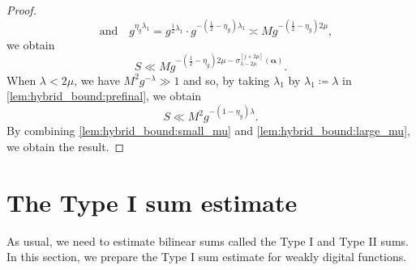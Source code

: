 \documentclass[hidelinks]{amsart}
\numberwithin{equation}{section}
\theoremstyle{plain}
\theoremstyle{definition}
\begin{document}
\begin{proof}
\[\quad\text{and}\quad
g^{\eta_{g}\lambda_{1}}
=
g^{\frac{1}{2}\lambda_{1}}
\cdot
g^{-(\frac{1}{2}-\eta_{g})\lambda_{1}}
\asymp
M
g^{-(\frac{1}{2}-\eta_{g})2\mu},
\]
we obtain
\begin{equation}
\label{lem:hybrid_bound:small_mu}
S
\ll
M
g^{-(\frac{1}{2}-\eta_{g})2\mu-\sigma_{\lambda-2\mu}^{[j+2\mu]}(\bm{\alpha})}.
\end{equation}
When $\lambda<2\mu$, we have $M^{2}g^{-\lambda}\gg1$
and so, by taking $\lambda_{1}$ by $\lambda_{1}\coloneqq\lambda$
in \cref{lem:hybrid_bound:prefinal}, we obtain
\begin{equation}
\label{lem:hybrid_bound:large_mu}
S
\ll
M^{2}
g^{-(1-\eta_{g})\lambda}.
\end{equation}
By combining \cref{lem:hybrid_bound:small_mu} and \cref{lem:hybrid_bound:large_mu},
we obtain the result.
\end{proof}

\section{The Type I sum estimate}
\label{sec:TypeI}
As usual, we need to estimate bilinear sums called the Type I and Type II sums.
In this section, we prepare the Type I sum estimate for weakly digital functions.
\end{document}
